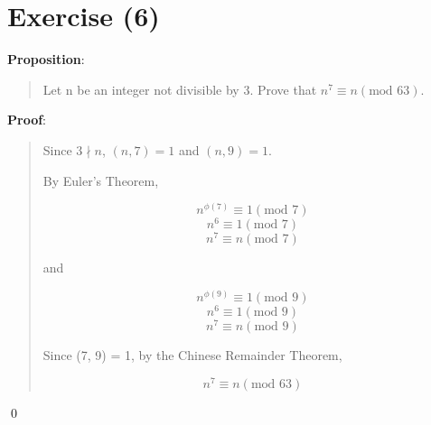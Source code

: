 \documentclass{article} %
\begin{document}
\section*{Exercise (6)}

\bigskip
\noindent
\textbf{Proposition}:
\begin{quote}
    Let n be an integer not divisible by 3. Prove that $n^7 \equiv n (\text{mod }63)$.
\end{quote}

\bigskip
\noindent
\textbf{Proof}:
\begin{quote}
    Since $3 \nmid n$, $(n, 7) = 1$ and $(n, 9) = 1$.

    By Euler's Theorem,

    \[n^{\phi(7)} \equiv 1 (\text{mod }7)\]
    \[n^6 \equiv 1 (\text{mod }7)\]
    \[n^7 \equiv n (\text{mod }7)\]

    and

    \[n^{\phi(9)} \equiv 1 (\text{mod }9)\]
    \[n^6 \equiv 1 (\text{mod }9)\]
    \[n^7 \equiv n (\text{mod }9)\]

    Since (7, 9) = 1, by the Chinese Remainder Theorem,

    \[n^7 \equiv n (\text{mod }63)\]
\end{quote}

\qed
\bigskip
\end{document}
